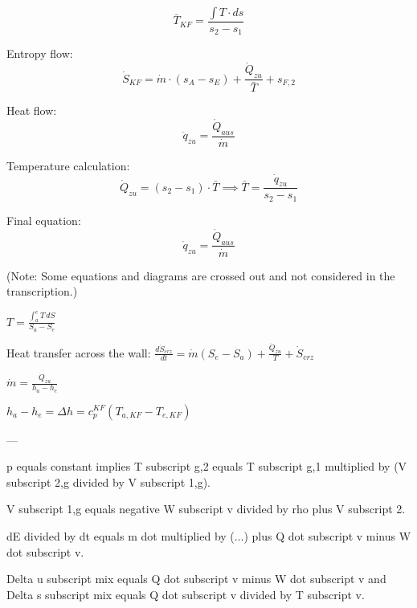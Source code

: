 \[
\bar{T}_{KF} = \frac{\int T \cdot ds}{s_2 - s_1}
\]  

Entropy flow:  
\[
\dot{S}_{KF} = \dot{m} \cdot (s_A - s_E) + \frac{\dot{Q}_{zu}}{\bar{T}} + s_{F,2}
\]  

Heat flow:  
\[
\dot{q}_{zu} = \frac{\dot{Q}_{aus}}{\dot{m}}
\]  

Temperature calculation:  
\[
\dot{Q}_{zu} = (s_2 - s_1) \cdot \bar{T} \implies \bar{T} = \frac{\dot{q}_{zu}}{s_2 - s_1}
\]  

Final equation:  
\[
\dot{q}_{zu} = \frac{\dot{Q}_{aus}}{\dot{m}}
\]  

(Note: Some equations and diagrams are crossed out and not considered in the transcription.)

\( T = \frac{\int_a^e T \, dS}{S_a - S_e} \)  

Heat transfer across the wall:  
\( \frac{d\dot{S}_{erz}}{dt} = \dot{m} (S_e - S_a) + \frac{\dot{Q}_{zu}}{T} + \dot{S}_{crz} \)  

\( \dot{m} = \frac{\dot{Q}_{zu}}{h_a - h_e} \)  

\( h_a - h_e = \Delta h = c_p^{KF} (T_{a, KF} - T_{e, KF}) \)  

---

p equals constant implies T subscript g,2 equals T subscript g,1 multiplied by (V subscript 2,g divided by V subscript 1,g).  

V subscript 1,g equals negative W subscript v divided by rho plus V subscript 2.  

dE divided by dt equals m dot multiplied by (...) plus Q dot subscript v minus W dot subscript v.  

Delta u subscript mix equals Q dot subscript v minus W dot subscript v and Delta s subscript mix equals Q dot subscript v divided by T subscript v.
